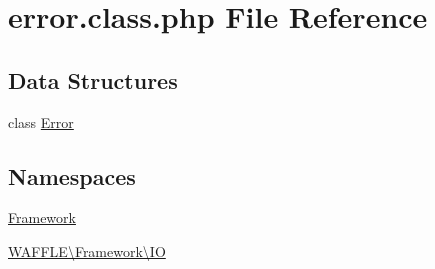 \hypertarget{error_8class_8php}{}\section{error.\+class.\+php File Reference}
\label{error_8class_8php}
\subsection*{Data Structures}
\begin{DoxyCompactItemize}
\item 
class \hyperlink{class_w_a_f_f_l_e_1_1_framework_1_1_i_o_1_1_error}{Error}
\end{DoxyCompactItemize}
\subsection*{Namespaces}
\begin{DoxyCompactItemize}
\item 
 \hyperlink{namespace_framework}{Framework}
\item 
 \hyperlink{namespace_w_a_f_f_l_e_1_1_framework_1_1_i_o}{W\+A\+F\+F\+L\+E\textbackslash{}\+Framework\textbackslash{}\+IO}
\end{DoxyCompactItemize}
